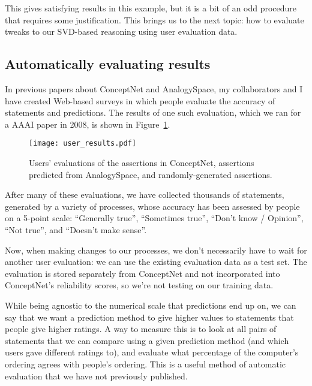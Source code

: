 \documentclass[11pt]{article}
\begin{document}
This gives satisfying results in this example, but it is a bit of
an odd procedure that requires some justification. This brings us to the next
topic: how to evaluate tweaks to our SVD-based reasoning using user evaluation
data.

\subsection{Automatically evaluating results}

In previous papers about ConceptNet and AnalogySpace, my collaborators and I
have created Web-based surveys in which people evaluate the accuracy of
statements and predictions. The results of one such evaluation, which we ran
for a AAAI paper in 2008, is shown in Figure~\ref{aaai-results}.

\begin{figure}[h]
\begin{center}
\texttt{[image: user\_results.pdf]}
\end{center}
\vspace{-2em}
\caption{Users' evaluations of the assertions in ConceptNet, assertions predicted from AnalogySpace, and randomly-generated assertions.}
\label{aaai-results}
\end{figure}

After many of these evaluations, we have collected thousands of statements,
generated by a variety of processes, whose accuracy has been assessed by people
on a 5-point scale: ``Generally true'', ``Sometimes true'', ``Don't know /
Opinion'', ``Not true'', and ``Doesn't make sense''.

Now, when making changes to our processes, we don't necessarily have to wait
for another user evaluation: we can use the existing evaluation data as a test
set. The evaluation is stored separately from ConceptNet and not incorporated
into ConceptNet's reliability scores, so we're not testing on our training
data.

While being agnostic to the numerical scale that predictions end up
on, we can say that we want a prediction method to give higher values to
statements that people give higher ratings. A way to measure this is to look at
all pairs of statements that we can compare using a given prediction method
(and which users gave different ratings to), and evaluate what percentage of
the computer's ordering agrees with people's ordering. This is a useful
method of automatic evaluation that we have not previously published.
\end{document}
